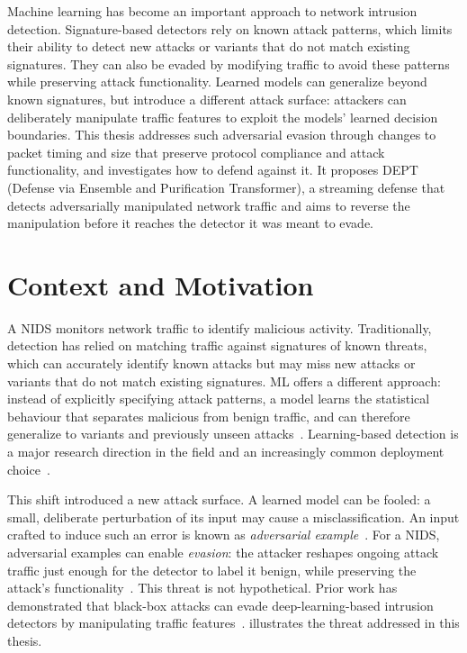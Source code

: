 \label{chap:intro}

Machine learning has become an important approach to network intrusion detection. 
Signature-based detectors rely on known attack patterns, which limits their ability to detect new attacks or variants that do not match existing signatures.
They can also be evaded by modifying traffic to avoid these patterns while preserving attack functionality.
Learned models can generalize beyond known signatures, but introduce a different attack surface: attackers can deliberately manipulate traffic features to exploit the models' learned decision boundaries.
This thesis addresses such adversarial evasion through changes to packet timing and size that preserve protocol compliance and attack functionality, and investigates how to defend against it.
It proposes DEPT
(Defense via Ensemble and Purification Transformer), a streaming defense that detects
adversarially manipulated network traffic and aims to reverse the manipulation before it reaches
the detector it was meant to evade.

\section{Context and Motivation}\label{sec:intro-context}
A \ac{NIDS} monitors network traffic to identify malicious activity.
Traditionally, detection has relied on matching traffic against signatures
of known threats, which can accurately identify known attacks but may miss new attacks or variants that do not match existing signatures.
\ac{ML} offers a different approach: instead of explicitly specifying attack patterns, a model learns the statistical behaviour that separates malicious from benign
traffic, and can therefore generalize to variants and previously unseen attacks~\cite{boutaba2018comprehensive,wang2021machine}. Learning-based detection is a major research direction in the field and an increasingly common deployment
choice~\cite{xu2025deep,anis2025survey}.

This shift introduced a new attack surface. A learned model can be fooled: a small,
deliberate perturbation of its input may cause a misclassification.
An input crafted to induce such an error is known as
\emph{adversarial example}~\cite{szegedy2014intriguing,goodfellow2014explaining}. For a
\ac{NIDS}, adversarial examples can enable \emph{evasion}: the attacker reshapes
ongoing attack traffic just enough for the detector to label it benign, while preserving the attack's functionality~\cite{he2023adversarial}. This threat is not hypothetical. Prior work has demonstrated that black-box attacks can evade deep-learning-based intrusion detectors by manipulating traffic features~\cite{zhang2020tiki}. 
illustrates the threat addressed in this thesis.

